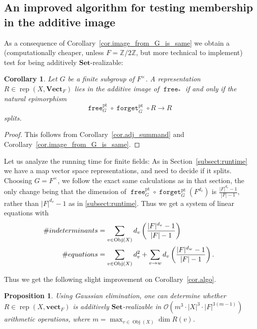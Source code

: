 \documentclass[a4paper]{amsart}
\theoremstyle{plain}
\newtheorem{proposition}[theorem]{Proposition}
\newtheorem{corollary}[theorem]{Corollary}
\theoremstyle{definition}
\theoremstyle{remark}
\newcommand{\funct}[1]{\operatorname{\mathtt{#1}}}
\newcommand{\Set}{\mathbf{Set}}
\newcommand{\VectF}{\mathbf{Vect}_F}
\newcommand{\vectF}{\mathbf{vect}_F}
\newcommand{\Z}{\mathbb{Z}}
\DeclareMathOperator{\rep}{rep}
\begin{document}
\subsection{An improved algorithm for testing membership in the additive image}
\label{sec:gset-algorithm}

As a consequence of Corollary~\ref{cor.image_from_G_is_same} we obtain a (computationally cheaper, unless \( F = \Z/2\Z \), but more technical to implement) test for being additively \( \Set \)-realizable:

\begin{corollary}
Let \( G \) be a finite subgroup of \( F^{\times} \). A representation \( R \in \rep(X, \VectF ) \) lies in the additive image of \( \funct{free}_* \) if and only if the natural epimorphism
\[ \funct{free}^\mathrm{pt}_G \circ \funct{forget}^\mathrm{pt}_G \circ R \to R \]
splits.
\end{corollary}
\begin{proof}
This follows from Corollary~\ref{cor.adj_summand} and Corollary~\ref{cor.image_from_G_is_same}.
\end{proof}

Let us analyze the running time for finite fields: As in Section~\ref{subsect:runtime} we have a map vector space representations, and need to decide if it splits. 
Choosing $G =F^{\times}$,
we follow the exact same calculations as in that section, the only change being that the dimension of  
\( \funct{free}^\mathrm{pt}_G \circ \funct{forget}^\mathrm{pt}_G (F^{d_v}) \)
is \( \frac{|F|^{d_v} - 1}{|F|-1} \), rather than \( |F|^{d_v} - 1 \) as in \ref{subsect:runtime}. Thus we get a system of linear equations with
\begin{align*}
\#{\rm indeterminants} &= \sum_{v \in \operatorname{Obj}(X)} d_v \left(\frac{|F|^{d_v} - 1}{|F|-1}\right)  \\
\#{\rm equations} &= \sum_{v \in \operatorname{Obj}(X)} d_v^2 + \sum_{v \to w } d_v \left(\frac{|F|^{d_w} - 1}{|F|-1}\right).
\end{align*}

Thus we get the following slight improvement on Corollary~\ref{cor.algo}.

\begin{proposition}
\label{prop:improvedalgo}
Using Gaussian elimination, one can determine whether $R\in \rep(X,\vectF)$ is additively $\Set$-realizable in $\mathcal{O}\left(m^3\cdot |X|^3\cdot |F|^{3(m-1)} \right)$ arithmetic operations, where $m = \max_{v \in \operatorname{Obj}(X)} \dim R(v)$.
\end{proposition}
\end{document}
